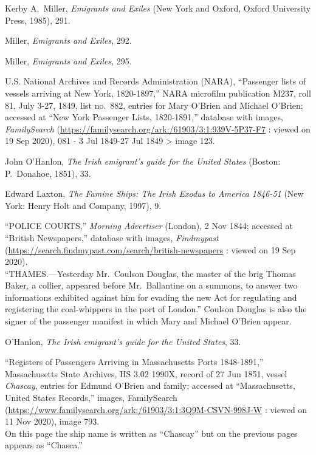 \begin{thebibliography}{999}
	

Kerby A.\ Miller, \textit{Emigrants and Exiles} (New York and Oxford, Oxford University Press, 1985), 291.

Miller, \textit{Emigrants and Exiles}, 292.

Miller, \textit{Emigrants and Exiles}, 295.

U.S. National Archives and Records Administration (NARA), ``Passenger lists of vessels arriving at New York, 1820-1897,'' NARA microfilm publication M237, roll 81, July 3-27, 1849, list no.\ 882, entries for Mary O'Brien and Michael O'Brien; accessed at ``New York Passenger Lists, 1820-1891,'' database with images, \textit{FamilySearch} (\url{https://familysearch.org/ark:/61903/3:1:939V-5P37-F7} : viewed on 19 Sep 2020), 081 - 3 Jul 1849-27 Jul 1849 > image 123.

John O'Hanlon, \textit{The Irish emigrant's guide for the United States} (Boston: P.\ Donahoe, 1851), 33.

Edward Laxton, \textit{The Famine Ships: The Irish Exodus to America 1846-51} (New York: Henry Holt and Company, 1997), 9. 

``POLICE COURTS,'' \textit{Morning Advertiser} (London), 2 Nov 1844; accessed at ``British Newspapers,'' database with images, \textit{Findmypast} (\url{https://search.findmypast.com/search/british-newspapers} : viewed on 19 Sep 2020).\\
``THAMES.---Yesterday Mr.\ Coulson Douglas, the master of the brig Thomas Baker, a collier, appeared before Mr.\ Ballantine on a summons, to answer two informations exhibited against him for evading the new Act for regulating and registering the coal-whippers in the port of London.'' Coulson Douglas is also the signer of the passenger manifest in which Mary and Michael O'Brien appear.

O'Hanlon, \textit{The Irish emigrant's guide for the United States}, 33.

``Registers of Passengers Arriving in Massachusetts Ports 1848-1891,'' Massachusetts State Archives, HS 3.02 1990X, record of 27 Jun 1851, vessel \textit{Chascay}, entries for Edmund O'Brien and family; accessed at ``Massachusetts, United States Records,'' images, FamilySearch (\url{https://www.familysearch.org/ark:/61903/3:1:3Q9M-CSVN-998J-W} : viewed on 11 Nov 2020), image 793.\\
On this page the ship name is written as ``Chascay'' but on the previous pages appears as ``Chasca.''


\end{thebibliography}
